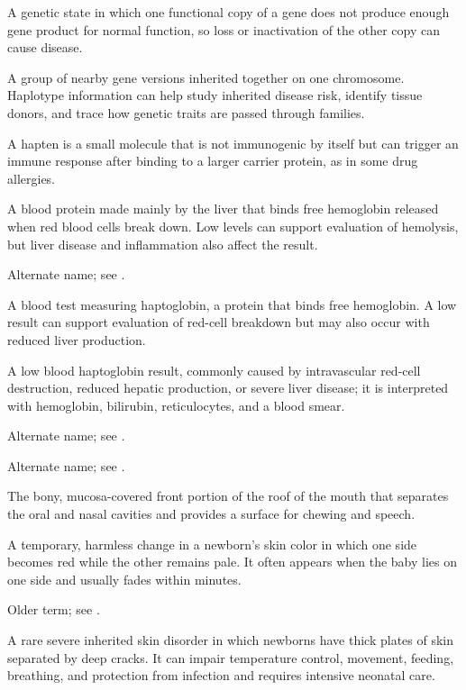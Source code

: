  A genetic state in which one functional copy of a gene does not produce enough gene product for normal function, so loss or inactivation of the other copy can cause disease.

 A group of nearby gene versions inherited together on one chromosome. Haplotype information can help study inherited disease risk, identify tissue donors, and trace how genetic traits are passed through families.

 A hapten is a small molecule that is not immunogenic by itself but can trigger an immune response after binding to a larger carrier protein, as in some drug allergies.

 A blood protein made mainly by the liver that binds free hemoglobin released when red blood cells break down. Low levels can support evaluation of hemolysis, but liver disease and inflammation also affect the result.

 Alternate name; see .

 A blood test measuring haptoglobin, a protein that binds free hemoglobin. A low result can support evaluation of red-cell breakdown but may also occur with reduced liver production.

 A low blood haptoglobin result, commonly caused by intravascular red-cell destruction, reduced hepatic production, or severe liver disease; it is interpreted with hemoglobin, bilirubin, reticulocytes, and a blood smear.

 Alternate name; see .

 Alternate name; see .

 The bony, mucosa-covered front portion of the roof of the mouth that separates the oral and nasal cavities and provides a surface for chewing and speech.

 A temporary, harmless change in a newborn’s skin color in which one side becomes red while the other remains pale. It often appears when the baby lies on one side and usually fades within minutes.

 Older term; see .

 A rare severe inherited skin disorder in which newborns have thick plates of skin separated by deep cracks. It can impair temperature control, movement, feeding, breathing, and protection from infection and requires intensive neonatal care.

